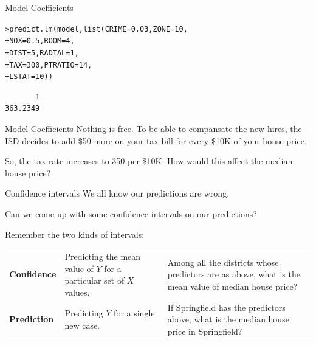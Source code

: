 \documentclass{beamer}\usepackage[]{graphicx}\usepackage[]{color}
\makeatletter
\newcommand{\hlnum}[1]{\textcolor[rgb]{0.824,0.412,0.118}{#1}}%
\newcommand{\hlstd}[1]{\textcolor[rgb]{1,0.894,0.769}{#1}}%
\newcommand{\hlkwc}[1]{\textcolor[rgb]{0.78,0.941,0.545}{#1}}%
\newcommand{\hlkwd}[1]{\textcolor[rgb]{1,0.78,0.769}{#1}}%
\newenvironment{kframe}{%
 \def\at@end@of@kframe{}%
 \ifinner\ifhmode%
  \def\at@end@of@kframe{\end{minipage}}%
  \begin{minipage}{\columnwidth}%
 \fi\fi%
 \def\FrameCommand##1{\hskip\@totalleftmargin \hskip-\fboxsep
 \colorbox{shadecolor}{##1}\hskip-\fboxsep
     \hskip-\linewidth \hskip-\@totalleftmargin \hskip\columnwidth}%
 \MakeFramed {\advance\hsize-\width
   \@totalleftmargin\z@ \linewidth\hsize
   \@setminipage}}%
 {\par\unskip\endMakeFramed%
 \at@end@of@kframe}
\newenvironment{knitrout}{}{} %
\makeatother
\begin{document}
\begin{darkframes}
\begin{frame}[fragile]{Model Coefficients}
\begin{knitrout}
\begin{kframe}
\begin{alltt}
\hlstd{> }\hlkwd{predict.lm}\hlstd{(model,} \hlkwd{list}\hlstd{(}\hlkwc{CRIME}\hlstd{=}\hlnum{0.03}\hlstd{,} \hlkwc{ZONE}\hlstd{=}\hlnum{10}\hlstd{,}
\hlstd{+ }                       \hlkwc{NOX}\hlstd{=}\hlnum{0.5}\hlstd{,} \hlkwc{ROOM}\hlstd{=}\hlnum{4}\hlstd{,}
\hlstd{+ }                       \hlkwc{DIST}\hlstd{=}\hlnum{5}\hlstd{,}  \hlkwc{RADIAL}\hlstd{=}\hlnum{1}\hlstd{,}
\hlstd{+ }                       \hlkwc{TAX}\hlstd{=}\hlnum{300}\hlstd{,} \hlkwc{PTRATIO}\hlstd{=}\hlnum{14}\hlstd{,}
\hlstd{+ }                       \hlkwc{LSTAT}\hlstd{=}\hlnum{10}\hlstd{))}
\end{alltt}
\begin{verbatim}
       1 
363.2349 
\end{verbatim}
\end{kframe}
\end{knitrout}
    \end{frame}
    
    
    
    \begin{frame}[fragile]{Model Coefficients}
      Nothing is free. To be able to compansate the new hires, the ISD decides to add \$50 more on your tax bill for every \$10K of your house price. \pause
      
      \bigskip
      So, the tax rate increases to 350 per \$10K. How would this affect the median house price?
      
      \lc
    
    \end{frame}
    
    
    
    \begin{frame}[fragile]{Confidence intervals}
      We all know our predictions are wrong. 
      
      Can we come up with some confidence intervals on our predictions? \pause
      \bigskip
      
      Remember the two kinds of intervals:
      \bigskip

      \begin{tabular}{lp{1in}p{2in}}
        \textbf{Confidence} & Predicting the mean value of $Y$ for a particular  set of $X$ values. & Among all the districts whose predictors are as above, what is the mean value of median house price?  \\
        \textbf{Prediction} & Predicting $Y$ for a single new case. & If Springfield has the predictors above, what is the median house price in Springfield?\\
      \end{tabular}
    

\end{frame}
\end{darkframes}
\end{document}
